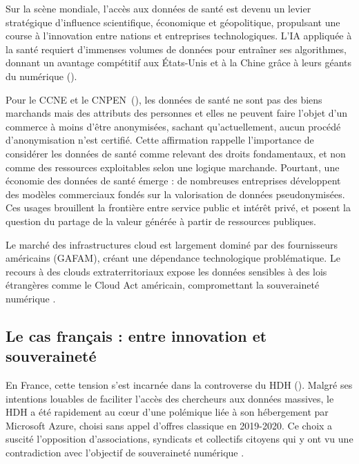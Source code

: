 \documentclass[10pt,a4paper]{article}
\begin{document}
Sur la scène mondiale, l’accès aux données de santé est devenu un levier stratégique d’influence scientifique, économique et géopolitique, propulsant une course à l'innovation entre nations et entreprises technologiques. L'IA appliquée à la santé requiert d'immenses volumes de données pour entraîner ses algorithmes, donnant un avantage compétitif aux États-Unis et à la Chine grâce à leurs géants du numérique (\cite{Floridi2018AI4PeopleComplete}).

Pour le CCNE et le CNPEN~(\citeyear{CCNECNPEN2023}), les données de santé ne sont pas des biens marchands mais des attributs des personnes et elles ne peuvent faire l’objet d’un commerce à moins d’être anonymisées, sachant qu’actuellement, aucun procédé d’anonymisation n’est certifié. Cette affirmation rappelle l’importance de considérer les données de santé comme relevant des droits fondamentaux, et non comme des ressources exploitables selon une logique marchande. Pourtant, une économie des données de santé émerge : de nombreuses entreprises développent des modèles commerciaux fondés sur la valorisation de données pseudonymisées. Ces usages brouillent la frontière entre service public et intérêt privé, et posent la question du partage de la valeur générée à partir de ressources publiques.

Le marché des infrastructures cloud est largement dominé par des fournisseurs américains (GAFAM), créant une dépendance technologique problématique. Le recours à des clouds extraterritoriaux expose les données sensibles à des lois étrangères comme le Cloud Act américain, compromettant la souveraineté numérique \parencite{douzet2020cyberespace}.

\subsection{Le cas français : entre innovation et souveraineté}

En France, cette tension s'est incarnée dans la controverse du HDH (\cite{Piquard2019}). Malgré ses intentions louables de faciliter l'accès des chercheurs aux données massives, le HDH a été rapidement au cœur d'une polémique liée à son hébergement par Microsoft Azure, choisi sans appel d'offres classique en 2019-2020. Ce choix a suscité l'opposition d'associations, syndicats et collectifs citoyens qui y ont vu une contradiction avec l'objectif de souveraineté numérique \parencite{LDH2025NonTransfertMicrosoft}.
\end{document}
